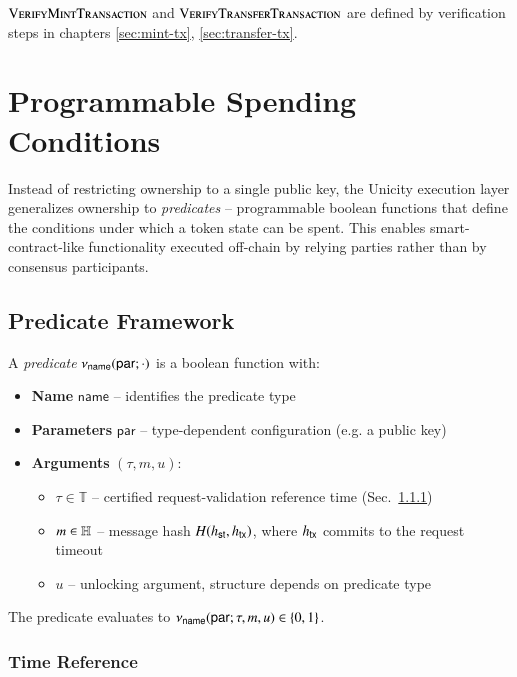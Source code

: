 $\Call{VerifyMintTransaction}{}$ and $\Call{VerifyTransferTransaction}{}$ are defined by verification steps in chapters \ref{sec:mint-tx}, \ref{sec:transfer-tx}.

\section{Programmable Spending Conditions}\label{sec:predicates}

Instead of restricting ownership to a single public key, the Unicity execution layer generalizes ownership to \emph{predicates} -- programmable boolean functions that define the conditions under which a token state can be spent. This enables smart-contract-like functionality executed off-chain by relying parties rather than by consensus participants.

\subsection{Predicate Framework}\label{sec:predicate-framework}

A \emph{predicate} $\nu_\mathsf{name}(\mathsf{par}; \cdot)$ is a boolean function with:
\begin{itemize}
	\item \textbf{Name} $\mathsf{name}$ -- identifies the predicate type
	\item \textbf{Parameters} $\mathsf{par}$ -- type-dependent configuration (e.g. a public key)
	\item \textbf{Arguments} $(\tau, m, u)$:
	\begin{itemize}
		\item $\tau \in \mathbb{T}$ -- certified request-validation reference time (Sec.~\ref{sec:time-extraction})
		\item $m \in \mathbb{H}$ -- message hash $H({h_\mathsf{st}}, {h_\mathsf{tx}})$, where ${h_\mathsf{tx}}$ commits to the request timeout
		\item $u$ -- unlocking argument, structure depends on predicate type
	\end{itemize}
\end{itemize}

The predicate evaluates to $\nu_\mathsf{name}(\mathsf{par}; \tau, m, u) \in \{0, 1\}$.


\subsubsection{Time Reference}\label{sec:time-extraction}

